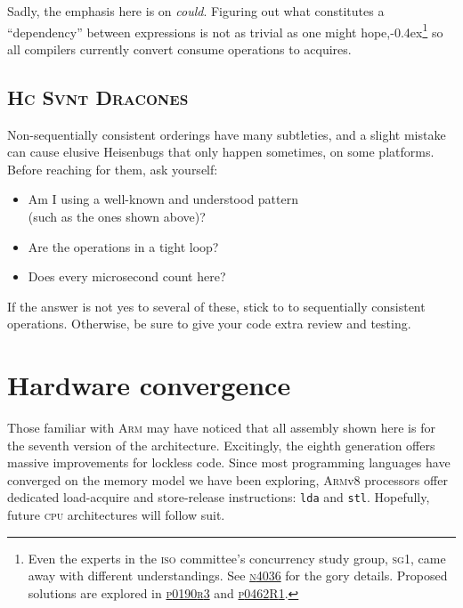 \documentclass[fontsize=10pt, oneside]{scrartcl}
\newcommand{\punckern}{\kern-0.4ex}
\newcommand{\monobox}[1]{\mbox{\texttt{#1}}}
\newcommand{\keyword}[1]{\monobox{\color{darkGreen}#1}}
\begin{document}
\setcounter{footnote}{0}
Sadly, the emphasis here is on \emph{could}.
Figuring out what constitutes a ``dependency'' between expressions is not as trivial as one might hope,\punckern\footnote{Even the experts in
the \textsc{iso} committee's concurrency study group, \textsc{sg}1,
came away with different understandings.
See
\href{https://www.open-std.org/jtc1/sc22/wg21/docs/papers/2014/n4036.pdf}{\textsc{n}4036}
for the gory details.
Proposed solutions are explored in
\href{https://www.open-std.org/jtc1/sc22/wg21/docs/papers/2017/p0190r3.pdf}{\textsc{p}0190\textsc{r}3}
and
\href{https://www.open-std.org/jtc1/sc22/wg21/docs/papers/2017/p0462r1.pdf}{\textsc{p}0462\textsc{R}1}.
}
so all compilers currently convert consume operations to acquires.

\subsection{\textsc{Hc Svnt Dracones}}

Non-sequentially consistent orderings have many subtleties,
and a slight mistake can cause elusive Heisenbugs that only happen sometimes,
on some platforms.
Before reaching for them, ask yourself:
\begin{itemize}[label={}, before=\itshape]
\item Am I using a well-known and understood pattern \\
      (such as the ones shown above)?
\item Are the operations in a tight loop?
\item Does every microsecond count here?
\end{itemize}
If the answer is not yes to several of these,
stick to to sequentially consistent operations.
Otherwise, be sure to give your code extra review and testing.

\section{Hardware convergence}

Those familiar with \textsc{Arm} may have noticed that all assembly shown here is for the seventh version of the architecture.
Excitingly, the eighth generation offers massive improvements for lockless code.
Since most programming languages have converged on the memory model we have been exploring,
\textsc{Arm}v8 processors offer dedicated load-acquire and store-release instructions: \keyword{lda} and \keyword{stl}.
Hopefully, future \textsc{cpu} architectures will follow suit.
\end{document}
